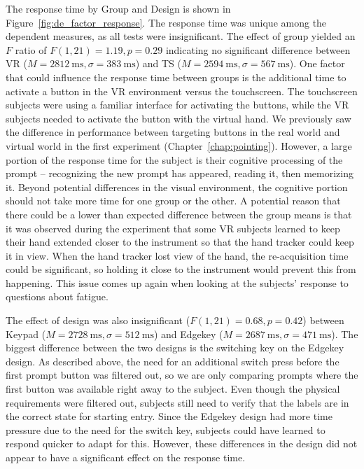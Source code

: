 The response time by Group and Design is shown in Figure~\ref{fig:de_factor_response}.
The response time was unique among the dependent measures, as all tests were insignificant.
The effect of group yielded an $F$ ratio of $F(1, 21) = 1.19, p = 0.29$ indicating no significant difference between VR ($M = \SI{2812}{\milli\second}, \sigma = \SI{383}{\milli\second}$) and TS ($M = \SI{2594}{\milli\second}, \sigma = \SI{567}{\milli\second}$).
One factor that could influence the response time between groups is the additional time to activate a button in the VR environment versus the touchscreen.
The touchscreen subjects were using a familiar interface for activating the buttons, while the VR subjects needed to activate the button with the virtual hand.
We previously saw the difference in performance between targeting buttons in the real world and virtual world in the first experiment (Chapter~\ref{chap:pointing}).
However, a large portion of the response time for the subject is their cognitive processing of the prompt -- recognizing the new prompt has appeared, reading it, then memorizing it.
Beyond potential differences in the visual environment, the cognitive portion should not take more time for one group or the other.
A potential reason that there could be a lower than expected difference between the group means is that it was observed during the experiment that some VR subjects learned to keep their hand extended closer to the instrument so that the hand tracker could keep it in view.
When the hand tracker lost view of the hand, the re-acquisition time could be significant, so holding it close to the instrument would prevent this from happening.
This issue comes up again when looking at the subjects' response to questions about fatigue.

The effect of design was also insignificant ($F(1, 21) = 0.68, p = 0.42$) between Keypad ($M=\SI{2728}{\milli\second}, \sigma=\SI{512}{\milli\second}$) and Edgekey ($M=\SI{2687}{\milli\second}, \sigma=\SI{471}{\milli\second}$).
The biggest difference between the two designs is the switching key on the Edgekey design.
As described above, the need for an additional switch press before the first prompt button was filtered out, so we are only comparing prompts where the first button was available right away to the subject.
Even though the physical requirements were filtered out, subjects still need to verify that the labels are in the correct state for starting entry.
Since the Edgekey design had more time pressure due to the need for the switch key, subjects could have learned to respond quicker to adapt for this.
However, these differences in the design did not appear to have a significant effect on the response time.

